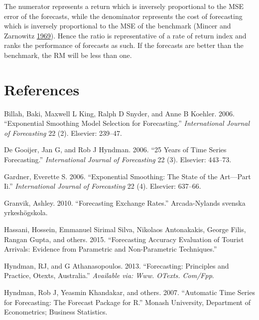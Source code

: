 \documentclass[12pt,preprint, authoryear]{elsarticle}
\numberwithin{equation}{section}
\numberwithin{figure}{section}
\numberwithin{table}{section}
\begin{document}
The numerator represents a return which is inversely proportional to the
MSE error of the forecasts, while the denominator represents the cost of
forecasting which is inversely proportional to the MSE of the benchmark
(Mincer and Zarnowitz
\protect\hyperlink{ref-mincer1969evaluation}{1969}). Hence the ratio is
representative of a rate of return index and ranks the performance of
forecasts as such. If the forecasts are better than the benchmark, the
RM will be less than one.

\newpage

\section*{References}\label{references}

\hypertarget{refs}{}
\hypertarget{ref-billah2006exponential}{}
Billah, Baki, Maxwell L King, Ralph D Snyder, and Anne B Koehler. 2006.
``Exponential Smoothing Model Selection for Forecasting.''
\emph{International Journal of Forecasting} 22 (2). Elsevier: 239--47.

\hypertarget{ref-de200625}{}
De Gooijer, Jan G, and Rob J Hyndman. 2006. ``25 Years of Time Series
Forecasting.'' \emph{International Journal of Forecasting} 22 (3).
Elsevier: 443--73.

\hypertarget{ref-gardner2006exponential}{}
Gardner, Everette S. 2006. ``Exponential Smoothing: The State of the
Art---Part Ii.'' \emph{International Journal of Forecasting} 22 (4).
Elsevier: 637--66.

\hypertarget{ref-granvik2010forecasting}{}
Granvik, Ashley. 2010. ``Forecasting Exchange Rates.'' Arcada-Nylands
svenska yrkeshögskola.

\hypertarget{ref-hassani2015forecasting}{}
Hassani, Hossein, Emmanuel Sirimal Silva, Nikolaos Antonakakis, George
Filis, Rangan Gupta, and others. 2015. ``Forecasting Accuracy Evaluation
of Tourist Arrivals: Evidence from Parametric and Non-Parametric
Techniques.''

\hypertarget{ref-hyndman2013forecasting}{}
Hyndman, RJ, and G Athanasopoulos. 2013. ``Forecasting: Principles and
Practice, Otexts, Australia.'' \emph{Available via: Www. OTexts.
Com/Fpp}.

\hypertarget{ref-hyndman2007automatic}{}
Hyndman, Rob J, Yeasmin Khandakar, and others. 2007. ``Automatic Time
Series for Forecasting: The Forecast Package for R.'' Monash University,
Department of Econometrics; Business Statistics.
\end{document}
